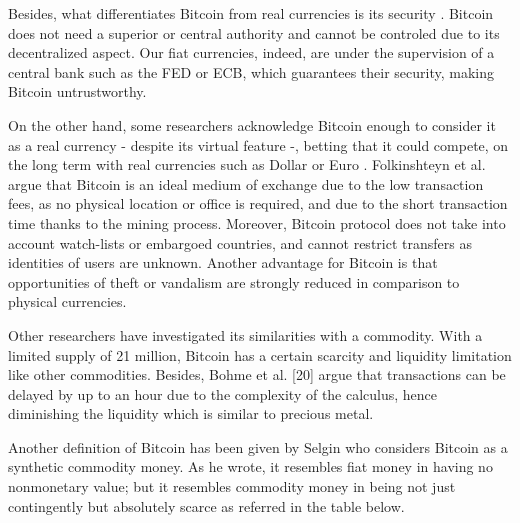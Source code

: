\documentclass[11pt]{report}
\begin{document}
Besides, what differentiates Bitcoin from real currencies is its security \cite{MOORE} \cite{YERMACK}.  Bitcoin does not need a superior or central authority and cannot be controled due to its decentralized aspect. Our fiat currencies, indeed, are under the supervision of a central bank such as the FED or ECB, which guarantees their security, making Bitcoin untrustworthy.   \medbreak

On the other hand, some researchers acknowledge Bitcoin enough to consider it as a real currency - despite its virtual feature -,   betting that it could compete, on the long term with real currencies such as Dollar or Euro \cite{PLASSARAS}\cite{LUTHER}. Folkinshteyn et al. \cite{LENNON} argue that Bitcoin is an ideal medium of exchange due to the low transaction fees, as no physical location or office is required, and due to the short transaction time thanks to the mining process. Moreover, Bitcoin protocol does not take into account watch-lists or embargoed countries, and cannot restrict transfers as identities of users are unknown. Another advantage for Bitcoin is that opportunities of theft or vandalism are strongly reduced in comparison to physical currencies. \medbreak

Other researchers have investigated its similarities with a commodity. With a limited supply of 21 million, Bitcoin has a certain scarcity and liquidity limitation like other commodities. Besides, Bohme et al. [20] argue that transactions can be delayed by up to an hour due to the complexity of the calculus, hence diminishing the liquidity which is similar to precious metal. \clearpage

Another definition of Bitcoin has been given by Selgin \cite{SELGIN} who considers Bitcoin as a synthetic commodity money. As he wrote, it resembles fiat money in having no nonmonetary value; but it resembles commodity money in being not just contingently but absolutely scarce as referred in the table below. 
\end{document}
